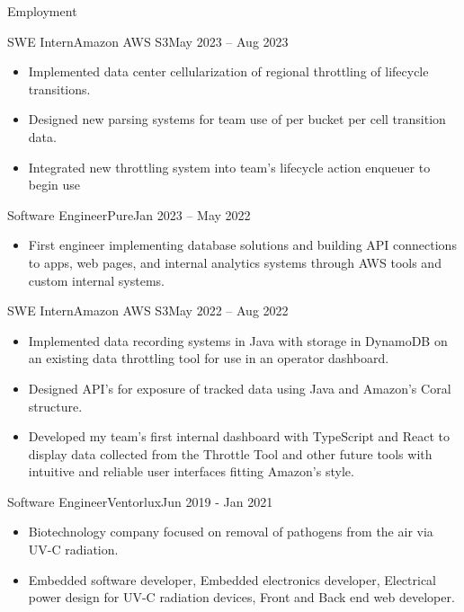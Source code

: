 \documentclass[]{mcdowellcv}
\begin{document}
	\begin{cvsection}{Employment}

            \begin{cvsubsection}{SWE Intern}{Amazon AWS S3}{May 2023 – Aug 2023}
			\begin{itemize}
            \item Implemented data center cellularization of regional throttling of lifecycle transitions.
            \item Designed new parsing systems for team use of per bucket per cell transition data.
            \item Integrated new throttling system into team's lifecycle action enqueuer to begin use
			\end{itemize}
		\end{cvsubsection}

            \begin{cvsubsection}{Software Engineer}{Pure}{Jan 2023 – May 2022}
			\begin{itemize}
            \item First engineer implementing database solutions and building API connections to apps, web pages, and internal analytics systems through AWS tools and custom internal systems. 
			\end{itemize}
		\end{cvsubsection}
 
		\begin{cvsubsection}{SWE Intern}{Amazon AWS S3}{May 2022 – Aug 2022}
			\begin{itemize}
            \item Implemented data recording systems in Java with storage in DynamoDB on an existing data throttling tool for use in an operator dashboard.
            \item Designed API's for exposure of tracked data using Java and Amazon's Coral structure.
			\item Developed my team's first internal dashboard with TypeScript and React to display data collected from the Throttle Tool and other future tools with intuitive and reliable user interfaces fitting Amazon's style.
			\end{itemize}
		\end{cvsubsection}
  
		\begin{cvsubsection}{Software Engineer}{Ventorlux}{Jun 2019 - Jan 2021}	
			\begin{itemize}
            	\item Biotechnology company focused on removal of pathogens from the air via UV-C radiation. 
                \item Embedded software developer, Embedded electronics developer, Electrical power design for UV-C radiation devices, Front and Back end web developer.
            \end{itemize}
		\end{cvsubsection}

	\end{cvsection}
\end{document}
